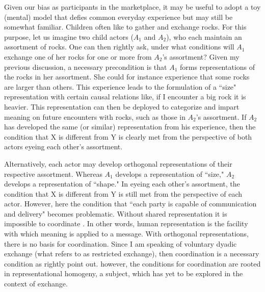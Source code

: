 Given our bias as participants in the marketplace, it may be useful to adopt a toy (mental) model that defies common everyday experience but may still be somewhat familiar. Children often like to gather and exchange rocks. For this purpose, let us imagine two child actors ($A_1$ and $A_2$), who each maintain an assortment of rocks. One can then rightly ask, under what conditions will $A_1$ exchange one of her rocks for one or more from $A_2$'s assortment? Given my previous discussion, a necessary precondition is that $A_1$ forms representations of the rocks in her assortment. She could for instance experience that some rocks are larger than others. This experience leads to the formulation of a ``size" representation with certain causal relations like, if I encounter a big rock it is heavier. This representation can then be deployed to categorize and impart meaning on future encounters with rocks, such as those in $A_2$'s assortment. If $A_2$ has developed the same (or similar) representation from his experience, then the condition that X is different from Y is clearly met from the perspective of both actors eyeing each other's assortment.

Alternatively, each actor may develop orthogonal representations of their respective assortment. Whereas $A_1$ develops a representation of ``size," $A_2$ develops a representation of ``shape." In eyeing each other's assortment, the condition that X is different from Y is still met from the perspective of each actor. However, here the condition that ``each party is capable of communication and delivery" \citep[i.e.][p. 8]{kotler1984} becomes problematic. Without shared representation it is impossible to coordinate \citep{shannon1948}. In other words, human representation is the facility with which meaning is applied to a message. With orthogonal representations, there is no basis for coordination. Since I am speaking of voluntary dyadic exchange (what \citet{bagozzi1975} refers to as restricted exchange), then coordination is a necessary condition as \citet{kotler1984} rightly point out. however, the conditions for coordination are rooted in representational homogeny, a subject, which has yet to be explored in the context of exchange.

